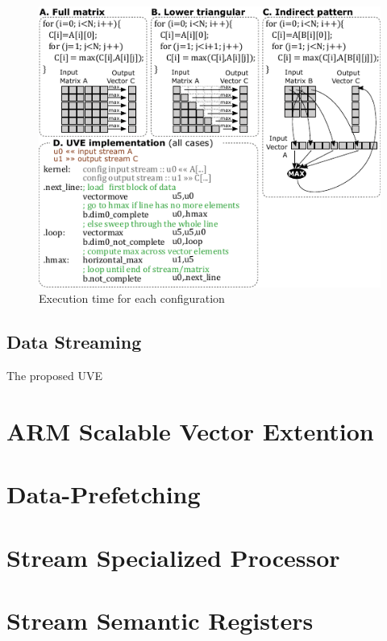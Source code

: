 \begin{figure}[H]
	\begin{center}
 		\includegraphics[width=0.37\linewidth]{images/memory-access.pdf}
 		\caption{Execution time for each configuration}
 		\label{fig:uve-mem-access}
	\end{center} 
\end{figure}

\subsection{Data Streaming}

The proposed UVE 



\section{ARM Scalable Vector Extention}
\section{Data-Prefetching}
\section{Stream Specialized Processor}
\section{Stream Semantic Registers}

